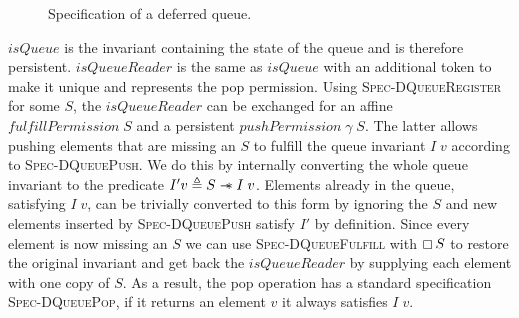\begin{figure}[ht]
  \caption{Specification of a deferred queue.}
  \label{fig:dm-deferred-spec}
\end{figure}

\(isQueue\) is the invariant containing the state of the queue and is therefore persistent.
\(isQueueReader\) is the same as \(isQueue\) with an additional token to make it unique and represents the pop permission.
Using \textsc{Spec-DQueueRegister} for some \(S\), the \(isQueueReader\) can be exchanged for an affine \(fulfillPermission\; S\) and a persistent \(pushPermission\; \gamma\; S\).
The latter allows pushing elements that are missing an \(S\) to fulfill the queue invariant \(I\; v\) according to \textsc{Spec-DQueuePush}.
We do this by internally converting the whole queue invariant to the predicate \(I' v \triangleq S \mathrel{-\!\!\ast} I\; v\).
Elements already in the queue, satisfying \(I\; v\), can be trivially converted to this form by ignoring the \(S\) and new elements inserted by \textsc{Spec-DQueuePush} satisfy \(I'\) by definition.
Since every element is now missing an \(S\) we can use \textsc{Spec-DQueueFulfill} with \(\mathop{\boxempty} S\) to restore the original invariant and get back the \(isQueueReader\) by supplying each element with one copy of \(S\).
As a result, the pop operation has a standard specification \textsc{Spec-DQueuePop}, if it returns an element \(v\) it always satisfies \(I\; v\).


